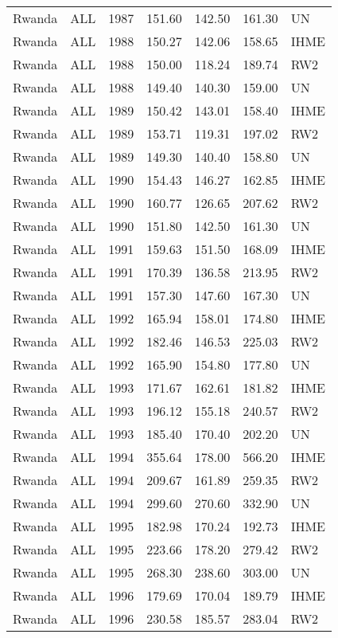 \begin{longtable}{lllrrrl}
  Rwanda & ALL & 1987 & 151.60 & 142.50 & 161.30 & UN \\ 
  Rwanda & ALL & 1988 & 150.27 & 142.06 & 158.65 & IHME \\ 
  Rwanda & ALL & 1988 & 150.00 & 118.24 & 189.74 & RW2 \\ 
  Rwanda & ALL & 1988 & 149.40 & 140.30 & 159.00 & UN \\ 
  Rwanda & ALL & 1989 & 150.42 & 143.01 & 158.40 & IHME \\ 
  Rwanda & ALL & 1989 & 153.71 & 119.31 & 197.02 & RW2 \\ 
  Rwanda & ALL & 1989 & 149.30 & 140.40 & 158.80 & UN \\ 
  Rwanda & ALL & 1990 & 154.43 & 146.27 & 162.85 & IHME \\ 
  Rwanda & ALL & 1990 & 160.77 & 126.65 & 207.62 & RW2 \\ 
  Rwanda & ALL & 1990 & 151.80 & 142.50 & 161.30 & UN \\ 
  Rwanda & ALL & 1991 & 159.63 & 151.50 & 168.09 & IHME \\ 
  Rwanda & ALL & 1991 & 170.39 & 136.58 & 213.95 & RW2 \\ 
  Rwanda & ALL & 1991 & 157.30 & 147.60 & 167.30 & UN \\ 
  Rwanda & ALL & 1992 & 165.94 & 158.01 & 174.80 & IHME \\ 
  Rwanda & ALL & 1992 & 182.46 & 146.53 & 225.03 & RW2 \\ 
  Rwanda & ALL & 1992 & 165.90 & 154.80 & 177.80 & UN \\ 
  Rwanda & ALL & 1993 & 171.67 & 162.61 & 181.82 & IHME \\ 
  Rwanda & ALL & 1993 & 196.12 & 155.18 & 240.57 & RW2 \\ 
  Rwanda & ALL & 1993 & 185.40 & 170.40 & 202.20 & UN \\ 
  Rwanda & ALL & 1994 & 355.64 & 178.00 & 566.20 & IHME \\ 
  Rwanda & ALL & 1994 & 209.67 & 161.89 & 259.35 & RW2 \\ 
  Rwanda & ALL & 1994 & 299.60 & 270.60 & 332.90 & UN \\ 
  Rwanda & ALL & 1995 & 182.98 & 170.24 & 192.73 & IHME \\ 
  Rwanda & ALL & 1995 & 223.66 & 178.20 & 279.42 & RW2 \\ 
  Rwanda & ALL & 1995 & 268.30 & 238.60 & 303.00 & UN \\ 
  Rwanda & ALL & 1996 & 179.69 & 170.04 & 189.79 & IHME \\ 
  Rwanda & ALL & 1996 & 230.58 & 185.57 & 283.04 & RW2 \\ 

\end{longtable}
